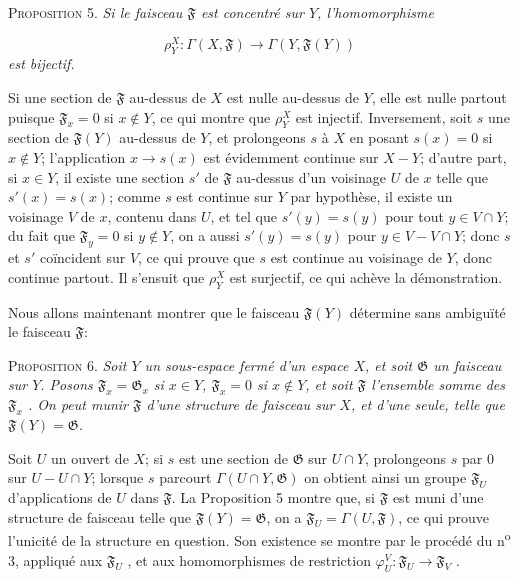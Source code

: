\textsc{Proposition} 5. \textit{Si le faisceau $\mathfrak{F}$ est concentré sur $Y$, l'homomorphisme}

\begin{equation*}
\rho^{X}_{Y} : \Gamma(X, \mathfrak{F}) \to \Gamma(Y, \mathfrak{F}(Y))
\end{equation*}
\textit{est bijectif.}

Si une section de $\mathfrak{F}$ au-dessus de $X$ est nulle au-dessus de $Y$, elle est nulle partout puisque $\mathfrak{F}_x = 0$ si $x \notin Y$, ce qui montre que $\rho^{X}_{Y}$ est injectif. Inversement, soit $s$ une section de $\mathfrak{F}(Y)$ au-dessus de $Y$, et prolongeons $s$ à $X$ en posant $s(x) = 0$ si $x \notin Y$; l'application $x \to s(x)$ est évidemment continue sur $X - Y$; d'autre part, si $x \in Y$, il existe une section $s'$ de $\mathfrak{F}$ au-dessus d'un voisinage $U$ de $x$ telle que $s'(x) = s(x)$; comme $s$ est continue sur $Y$ par hypothèse, il existe un voisinage $V$ de $x$, contenu dans $U$, et tel que $s'(y) = s(y)$ pour tout $y \in V \cap Y$; du fait que $\mathfrak{F}_y = 0$ si $y \notin Y$, on a aussi $s'(y) = s(y)$ pour $y \in V - V \cap Y$; donc $s$ et $s'$ coïncident sur $V$, ce qui prouve que $s$ est continue au voisinage de $Y$, donc continue partout. Il s'ensuit que $\rho^{X}_{Y}$ est surjectif, ce qui achève la démonstration.

Nous allons maintenant montrer que le faisceau $\mathfrak{F}(Y)$ détermine sans ambiguïté le faisceau $\mathfrak{F}$:

\textsc{Proposition} 6. \textit{Soit $Y$ un sous-espace fermé d'un espace $X$, et soit $\mathfrak{G}$ un faisceau sur $Y$. Posons $\mathfrak{F}_x = \mathfrak{G}_x$ si $x \in Y$, $\mathfrak{F}_x = 0$ si $x \notin Y$, et soit $\mathfrak{F}$ l'ensemble somme des $\mathfrak{F}_x$ . On peut munir $\mathfrak{F}$ d'une structure de faisceau sur $X$, et d'une seule, telle que $\mathfrak{F}(Y) = \mathfrak{G}$.}

Soit $U$ un ouvert de $X$; si $s$ est une section de $\mathfrak{G}$ sur $U \cap Y$, prolongeons $s$ par $0$ sur $U - U \cap Y$; lorsque $s$ parcourt $\Gamma(U \cap Y, \mathfrak{G})$ on obtient ainsi un groupe $\mathfrak{F}_U$ d'applications de $U$ dans $\mathfrak{F}$. La Proposition 5 montre que, si $\mathfrak{F}$ est muni d'une structure de faisceau telle que $\mathfrak{F}(Y) = \mathfrak{G}$, on a $\mathfrak{F}_U = \Gamma(U, \mathfrak{F})$, ce qui prouve l'unicité de la structure en question. Son existence se montre par le procédé du n\textsuperscript{o} 3, appliqué aux $\mathfrak{F}_U$ , et aux homomorphismes de restriction $\varphi^{V}_{U} : \mathfrak{F}_U \to \mathfrak{F}_V$ .

